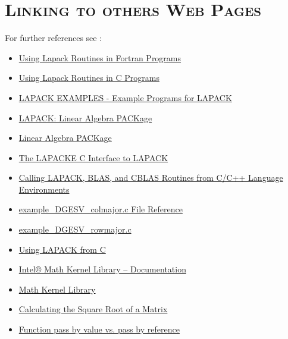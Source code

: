 \documentclass[xcolor=x11names,compress]{beamer}
\renewcommand{\(}{\begin{columns}}
\renewcommand{\)}{\end{columns}}
\newcommand{\<}[1]{\begin{column}{#1}}
\renewcommand{\>}{\end{column}}
\begin{document}
\section{\scshape Linking to others Web Pages}
\begin{frame}[fragile]{For further references see :}
\begin{scriptsize}
\begin{itemize}
\item \href{http://physics.oregonstate.edu/~landaur/nacphy/lapack/fortran.html}{Using Lapack Routines in Fortran Programs}
\item \href{http://physics.oregonstate.edu/~landaur/nacphy/lapack/cprogp.html}{Using Lapack Routines in C Programs}
\item \href{https://people.sc.fsu.edu/~jburkardt/f_src/lapack_examples/lapack_examples.html}{LAPACK EXAMPLES - Example Programs for LAPACK}
\item \href{http://www.netlib.org/lapack/explore-html/dir_01b0e9dedaacaaad221a964f5affeb80.html}{LAPACK: Linear Algebra PACKage}
\item \href{http://www.netlib.org/lapack/}{Linear Algebra PACKage}
\item \href{http://www.netlib.org/lapack/lapacke.html}{The LAPACKE C Interface to LAPACK}
\item \href{https://software.intel.com/en-us/node/528727}{Calling LAPACK, BLAS, and CBLAS Routines from C/C++ Language Environments}
\item \href{http://www.netlib.org/lapack/explore-html/d5/df8/example___d_g_e_s_v__colmajor_8c.html}{example\_DGESV\_colmajor.c File Reference}
\item \href{http://www.netlib.org/lapack/explore-html/d6/d06/example___d_g_e_s_v__rowmajor_8c_source.html}{example\_DGESV\_rowmajor.c}
\item \href{https://userinfo.surfsara.nl/systems/lisa/software/lapacke}{Using LAPACK from C}
\item \href{https://software.intel.com/en-us/articles/intel-math-kernel-library-documentation}{Intel® Math Kernel Library – Documentation}
\item \href{https://en.wikipedia.org/wiki/Math_Kernel_Library}{Math Kernel Library}
\item \href{http://www.seehuhn.de/pages/matrixfn}{Calculating the Square Root of a Matrix}
\item \href{http://courses.washington.edu/css342/zander/css332/passby.html}{Function pass by value vs. pass by reference}

\end{itemize}
\end{scriptsize}
\end{frame}
\end{document}
